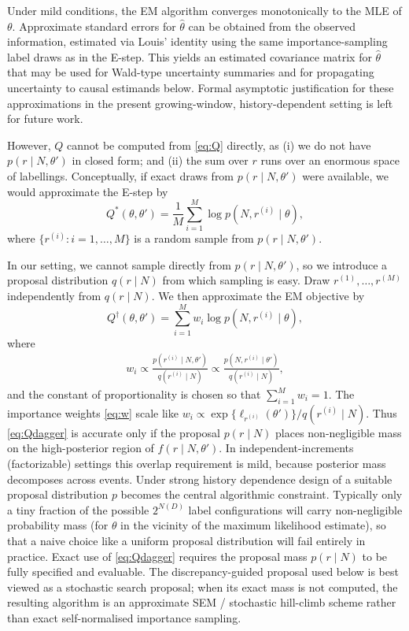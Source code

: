 \documentclass{statsoc}
\newcommand{\1}{\mathbbm{1}}
\newcommand{\Nproc}{N}
\begin{document}
Under mild conditions, the EM algorithm converges monotonically to the MLE of $\theta$. Approximate standard errors for \(\hat\theta\) can be obtained from the observed information, estimated via Louis' identity \citep{louis1982finding} using the same importance-sampling label draws as in the E-step. This yields an estimated covariance matrix for \(\hat\theta\) that may be used for Wald-type uncertainty summaries and for propagating uncertainty to causal estimands below. Formal asymptotic justification for these approximations in the present growing-window, history-dependent setting is left for future work.

However, $Q$ cannot be computed from \eqref{eq:Q} directly, as (i) we do not have $p(r \mid N, \theta')$ in closed form; and (ii) the sum over $r$ runs over an enormous space of labellings. Conceptually, if exact draws from \(p(r\mid N,\theta')\) were available, we would approximate the E-step by
\begin{equation}
Q^*(\theta,\theta') = \frac{1}{M}\sum_{i=1}^M \log p(N,r^{(i)}\mid \theta), \label{eq:Qstar}
\end{equation}
where $\{r^{(i)}\colon i =1,\ldots,M\}$ is a random sample from $p(r \mid N, \theta')$.

In our setting, we cannot sample directly from \(p(r\mid N,\theta')\), so we introduce a proposal distribution \(q(r\mid N)\) from which sampling is easy. Draw \(r^{(1)},\ldots,r^{(M)}\) independently from \(q(r\mid N)\). We then approximate the EM objective by
\begin{equation}
Q^\dagger(\theta,\theta') = \sum_{i=1}^M w_i \log p(N,r^{(i)}\mid \theta), \label{eq:Qdagger}
\end{equation}
where
\begin{align}
w_i \propto \frac{p(r^{(i)}\mid N,\theta')}{q(r^{(i)}\mid N)} 
    \propto \frac{p(N,r^{(i)}\mid \theta')}{q(r^{(i)}\mid N)}, \label{eq:w}
\end{align}
and the constant of proportionality is chosen so that \(\sum_{i=1}^M w_i=1\). The importance weights \eqref{eq:w} scale like
\(
w_i \propto \exp\{\ell_{r^{(i)}}(\theta')\}/q(r^{(i)}\mid \Nproc).
\)
Thus \eqref{eq:Qdagger} is accurate only if the proposal \(p(r\mid \Nproc)\) places non-negligible mass on the high-posterior region of \(f(r\mid \Nproc,\theta')\). In independent-increments (factorizable) settings this overlap requirement is mild, because posterior mass decomposes across events. Under strong history dependence design of a suitable proposal distribution $p$ becomes the central algorithmic constraint. Typically only a tiny fraction of the possible \(2^{\Nproc(D)}\) label configurations will carry non-negligible probability mass (for $\theta$ in the vicinity of the maximum likelihood estimate), so that a naive choice like a uniform proposal distribution will fail entirely in practice. Exact use of \eqref{eq:Qdagger} requires the proposal mass \(p(r\mid N)\) to be fully specified and evaluable. The discrepancy-guided proposal used below is best viewed as a stochastic search proposal; when its exact mass is not computed, the resulting algorithm is an approximate SEM / stochastic hill-climb scheme rather than exact self-normalised importance sampling.
\end{document}
